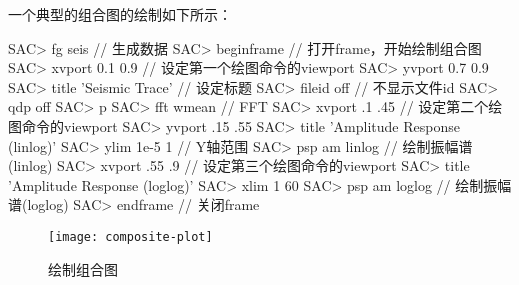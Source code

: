 一个典型的组合图的绘制如下所示：
\begin{SACCode}
SAC> fg seis                        // 生成数据
SAC> beginframe                     // 打开frame，开始绘制组合图
SAC> xvport 0.1 0.9                 // 设定第一个绘图命令的viewport
SAC> yvport 0.7 0.9                 
SAC> title 'Seismic Trace'          // 设定标题
SAC> fileid off                     // 不显示文件id
SAC> qdp off                        
SAC> p                              
SAC> fft wmean                      // FFT
SAC> xvport .1 .45                  // 设定第二个绘图命令的viewport
SAC> yvport .15 .55
SAC> title 'Amplitude Response (linlog)'
SAC> ylim 1e-5 1                    // Y轴范围
SAC> psp am linlog                  // 绘制振幅谱(linlog)
SAC> xvport .55 .9                  // 设定第三个绘图命令的viewport
SAC> title 'Amplitude Response (loglog)'
SAC> xlim 1 60
SAC> psp am loglog                  // 绘制振幅谱(loglog)
SAC> endframe                       // 关闭frame
\end{SACCode}

\begin{figure}[H]
\centering
\texttt{[image: composite-plot]}
\caption{绘制组合图}
\label{fig:composite-plot}
\end{figure}
